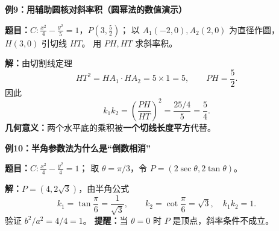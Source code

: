 \begin{examplebox}
\medskip
\textbf{\textcolor{CExample}{例9：用辅助圆核对斜率积（圆幂法的数值演示）}}

\textbf{题目：}$C:\frac{x^2}{4}-\frac{y^2}{5}=1$，$P(3,\frac52)$；
以 $A_1(-2,0),A_2(2,0)$ 为直径作圆，$H(3,0)$ 引切线 $HT$。
用 $PH,HT$ 求斜率积。

\textbf{解：}由切割线定理
\[
 HT^2=HA_1\cdot HA_2=5\times1=5,\qquad PH=\frac52.
\]
因此
\[
 \boxed{k_1k_2=\left(\frac{PH}{HT}\right)^2
 =\frac{25/4}{5}=\frac54}.
\]
\textbf{几何意义：}两个水平底的乘积被\textbf{一个切线长度平方}代替。

\medskip
\textbf{\textcolor{CExample}{例10：半角参数法为什么是“倒数相消”}}

\textbf{题目：}$C:\frac{x^2}{4}-\frac{y^2}{4}=1$；
取 $\theta=\pi/3$，令 $P=(2\sec\theta,2\tan\theta)$。

\textbf{解：}$P=(4,2\sqrt3)$，由半角公式
\[
 k_1=\tan\frac\pi6=\frac1{\sqrt3},\qquad
 k_2=\cot\frac\pi6=\sqrt3,
 \quad\boxed{k_1k_2=1}.
\]
验证 $b^2/a^2=4/4=1$。
\textbf{提醒：}当 $\theta=0$ 时 $P$ 是顶点，斜率条件不成立。

\end{examplebox}

